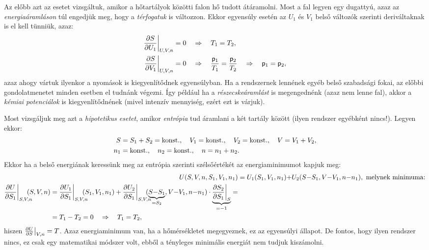Az előbb azt az esetet vizsgáltuk, amikor a hőtartályok közötti falon hő tudott átáramolni. Most a fal legyen egy dugattyú, azaz az \emph{energiaáramláson} túl engedjük meg, hogy a \emph{térfogatuk} is változzon. Ekkor egyensúly esetén az $U_1$ és $V_1$ belső változók szerinti deriváltaknak is el kell tünniük, azaz:
\begin{align}
\begin{split}
	\frac{\partial{S}}{\partial{U_1}}\bigg|_{U,V,n} &= 0 \quad\Rightarrow\quad T_1=T_2,\\
	\frac{\partial{S}}{\partial{V_1}}\bigg|_{U,V,n} &= 0 \quad\Rightarrow\quad \frac{\mathsf p_1}{T_1}=\frac{\mathsf p_2}{T_2}\quad\Rightarrow\quad \mathsf p_1=\mathsf p_2,
\end{split}
\end{align} 
azaz ahogy vártuk ilyenkor a nyomások is kiegyenlítődnek egyensúlyban. Ha a rendszernek lennének egyéb belső szabadsági fokai, az előbbi gondolatmenetet minden esetben el tudnánk végezni. Így például ha a \emph{részecskeáramlást} is megengednénk (azaz nem lenne fal), akkor a \emph{kémiai potenciálok} is kiegyenlítődnének (mivel intenzív mennyiség, ezért ezt is várjuk).

Most vizsgáljuk meg azt a \emph{hipotetikus esetet}, amikor \emph{entrópia} tud áramlani a két tartály között (ilyen rendszer egyébként nincs!). Legyen ekkor:
\begin{align}
\begin{split}
	S&=S_1+S_2=\textnormal{konst.},\quad V_1=\textnormal{konst.},\quad V_2=\textnormal{konst.},\quad V=V_1+V_2,\\
	n_1&=\textnormal{konst.},\quad n_2=\textnormal{konst.},\quad n = n_1+n_2.
\end{split}
\end{align}
Ekkor ha a belső energiának keressünk meg az entrópia szerinti szélsőértékét az energiaminimumot kapjuk meg:
\begin{align}
	U(S,V,n,S_1,V_1,n_1) &= U_1(S_1,V_1,n_1){+}U_2(S{-}S_1,V{-}V_1,n{-}n_1),\tn{ melynek  minimuma:}\\
\begin{split}
	\pd{U}{S_1}\bigg|_{S,V,n}\hspace{-3mm}(S,V,n) &= \pd{U_1}{S_1}\bigg|_{S,V,n}\hspace{-3mm}(S_1,V_1,n_1)+\pd{U_2}{S_1}\bigg|_{S,V,n}\hspace{-3mm}(\underbrace{S{-}S_1}_{=S_2},V{-}V_1,n{-}n_1)\cdot \underbrace{\pd{S_2}{S_1}\bigg|_{S}}_{=-1} =\\
	&= T_1-T_2 = 0 \follows T_1=T_2,
\end{split}
\end{align}
hiszen $\frac{\partial{U}}{\partial{S}}\big|_{V,n}=T$. Azaz energiaminimum van, ha a hőmérsékletet megegyeznek, ez az egyensúlyi állapot. De fontos, hogy ilyen rendszer nincs, ez csak egy matematikai módszer volt, ebből a tényleges minimális energiát nem tudjuk kiszámolni.

